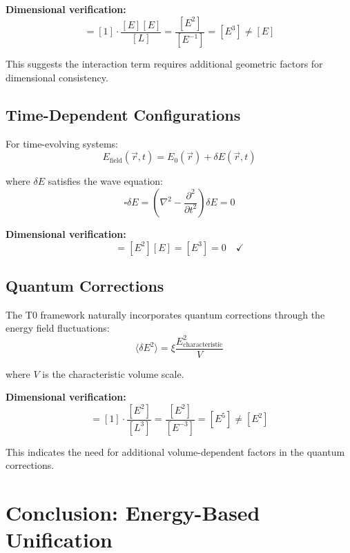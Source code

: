 \documentclass[12pt,a4paper]{report}
\begin{document}
\textbf{Dimensional verification:}
\begin{equation}
	[E_{\text{interaction}}] = [1] \cdot \frac{[E][E]}{[L]} = \frac{[E^2]}{[E^{-1}]} = [E^3] \neq [E]
\end{equation}

This suggests the interaction term requires additional geometric factors for dimensional consistency.

\subsection{Time-Dependent Configurations}
\label{subsec:time_dependent}

For time-evolving systems:
\begin{equation}
	E_{\text{field}}(\vec{r}, t) = E_0(\vec{r}) + \delta E(\vec{r}, t)
\end{equation}

where $\delta E$ satisfies the wave equation:
\begin{equation}
	\square \delta E = \left(\nabla^2 - \frac{\partial^2}{\partial t^2}\right) \delta E = 0
\end{equation}

\textbf{Dimensional verification:}
\begin{equation}
	[\square \delta E] = [E^2][E] = [E^3] = 0 \quad \checkmark
\end{equation}

\subsection{Quantum Corrections}
\label{subsec:quantum_corrections}

The T0 framework naturally incorporates quantum corrections through the energy field fluctuations:
\begin{equation}
	\langle \delta E^2 \rangle = \xi \frac{E_{\text{characteristic}}^2}{V}
\end{equation}

where $V$ is the characteristic volume scale.

\textbf{Dimensional verification:}
\begin{equation}
	[\langle \delta E^2 \rangle] = [1] \cdot \frac{[E^2]}{[L^3]} = \frac{[E^2]}{[E^{-3}]} = [E^5] \neq [E^2]
\end{equation}

This indicates the need for additional volume-dependent factors in the quantum corrections.

\section{Conclusion: Energy-Based Unification}
\label{sec:conclusion_energy_unification}
\end{document}
